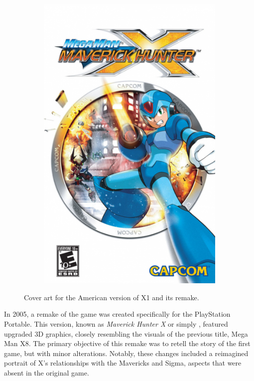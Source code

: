 \begin{figure}[htp]
\begin{subfigure}[c]{0.4\linewidth}
		\includegraphics[width=\linewidth]{figures/X1/mmxmh.png}
	\end{subfigure}
	\caption{Cover art for the American version of X1 and its remake.}
\end{figure}
In 2005, a remake of the game was created specifically for the PlayStation Portable. This version, known as \textit{Maverick Hunter X} or simply \mhx, featured upgraded 3D graphics, closely resembling the visuals of the previous title, Mega Man X8. The primary objective of this remake was to retell the story of the first game, but with minor alterations. Notably, these changes included a reimagined portrait of X's relationships with the Mavericks and Sigma, aspects that were absent in the original game.

